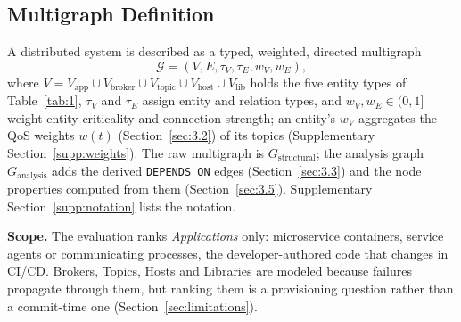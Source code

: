 \documentclass[preprint,3p]{elsarticle}
\begin{document}
\subsection{Multigraph Definition}
\label{sec:3.1}

A distributed system is described as a typed, weighted, directed multigraph
\begin{equation}
\label{eq:sag_multigraph}
\mathcal{G} = (V, E, \tau_V, \tau_E, w_V, w_E),
\end{equation}
where $V = V_{\text{app}} \cup V_{\text{broker}} \cup V_{\text{topic}} \cup V_{\text{host}} \cup V_{\text{lib}}$ holds the five entity types of Table~\ref{tab:1}, $\tau_V$ and $\tau_E$ assign entity and relation types, and $w_V, w_E \in (0, 1]$ weight entity criticality and connection strength; an entity's $w_V$ aggregates the QoS weights $w(t)$ (Section~\ref{sec:3.2}) of its topics (Supplementary Section~\ref{supp:weights}). The raw multigraph is $G_{\text{structural}}$; the analysis graph $G_{\text{analysis}}$ adds the derived \texttt{DEPENDS\_ON} edges (Section~\ref{sec:3.3}) and the node properties computed from them (Section~\ref{sec:3.5}). Supplementary Section~\ref{supp:notation} lists the notation.

\noindent\textbf{Scope.} The evaluation ranks \emph{Applications} only: microservice containers, service agents or communicating processes, the developer-authored code that changes in CI/CD. Brokers, Topics, Hosts and Libraries are modeled because failures propagate through them, but ranking them is a provisioning question rather than a commit-time one (Section~\ref{sec:limitations}).
\end{document}
